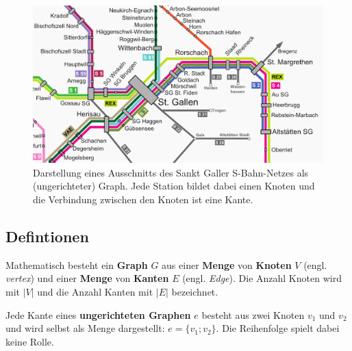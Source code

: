 \begin{figure}[htb]
\begin{center}

\includegraphics[width=.67\textwidth]{../fig/sbahn_netz_ausschnitt.png}
\caption{Darstellung eines Ausschnitts des Sankt Galler S-Bahn-Netzes als (ungerichteter) Graph.
Jede Station bildet dabei einen Knoten und die Verbindung zwischen den Knoten ist eine Kante.
}

\label{fig:sbahn}
\end{center}
\end{figure}


\subsection{Defintionen}

\begin{mdef}
Mathematisch besteht ein \textbf{Graph} $G$ aus einer \textbf{Menge} von \textbf{Knoten} $V$ (engl. \emph{vertex}) und einer \textbf{Menge} von \textbf{Kanten} $E$ (engl. \emph{Edge}).
Die Anzahl Knoten wird mit $|V|$ und die Anzahl Kanten mit $|E|$ bezeichnet.
\end{mdef}



\begin{mdef}
Jede Kante eines \textbf{ungerichteten Graphen} $e$ besteht aus zwei Knoten $v_1$ und $v_2$ und wird selbst als Menge dargestellt: $e= \{v_1;v_2\}$.
Die Reihenfolge spielt dabei keine Rolle.
\end{mdef}

